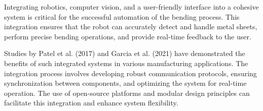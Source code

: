 Integrating robotics, computer vision, and a user-friendly interface into a cohesive system is critical for the successful automation of the bending process. This integration ensures that the robot can accurately detect and handle metal sheets, perform precise bending operations, and provide real-time feedback to the user.

Studies by Patel et al. (2017) and Garcia et al. (2021) have demonstrated the benefits of such integrated systems in various manufacturing applications. The integration process involves developing robust communication protocols, ensuring synchronization between components, and optimizing the system for real-time operation. The use of open-source platforms and modular design principles can facilitate this integration and enhance system flexibility.